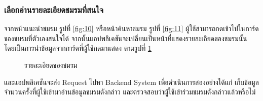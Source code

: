 \documentclass[14pt,oneside,openright,a4paper]{cpe-thai-project}
\begin{document}
\subsubsection{เลือกอ่านรายละเอียดชมรมที่สนใจ}
จากหน้าแนะนำชมรม รูปที่ \ref{fig:10}  หรือหน้าค้นหาชมรม รูปที่ \ref{fig:11} ผู้ใช้สามารถกดเข้าไปในการ์ดของชมรมที่ตัวเองสนใจได้ จากนั้นแอปพลิเคชันจะเปลี่ยนเป็นหน้าที่แสดงรายละเอียดของชมรมนั้น โดยเป็นการนำข้อมูลจากการ์ดที่ผู้ใช้กดมาแสดง ตามรูปที่ \ref{fig:14}
\begin{figure}[H]\centering
  \setlength{\fboxrule}{0.5mm}
  \setlength{\fboxsep}{0.5cm}
  \caption{รายละเอียดของชมรม}\label{fig:14}
\end{figure}
และแอปพลิเคชันจะส่ง Request ไปหา Backend System เพื่อดำเนินการสองอย่างได้แก่ เก็บข้อมูลจำนวนครั้งที่ผู้ใช้เข้ามาอ่านข้อมูลชมรมดังกล่าว และตรวจสอบว่าผู้ใช้เข้าร่วมชมรมดังกล่าวแล้วหรือไม่
\end{document}
